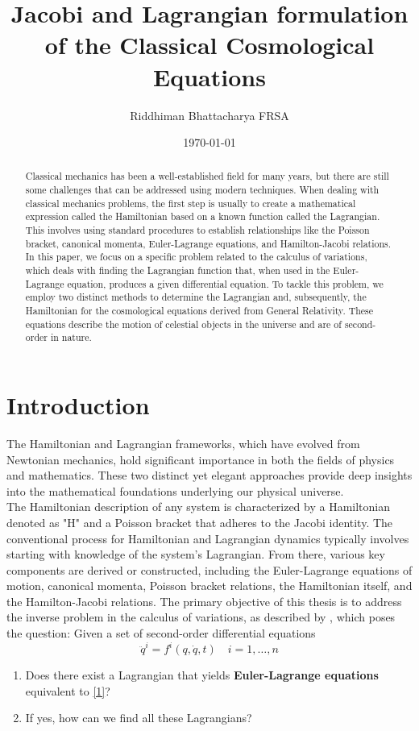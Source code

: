 \documentclass[12pt]{article}
\title{\textbf{\Huge Jacobi and Lagrangian formulation of the Classical Cosmological Equations}}
\author{Riddhiman Bhattacharya FRSA}
\affil{Fellow of Royal Society of Arts, London, UK\\
Contact:\url{riddhiman.butai2005@gmail.com}}
\date{\today}
\begin{document}
\maketitle
\begin{abstract}

    Classical mechanics has been a well-established field for many years, but there are still some challenges that can be addressed using modern techniques. When dealing with classical mechanics problems, the first step is usually to create a mathematical expression called the Hamiltonian based on a known function called the Lagrangian. This involves using standard procedures to establish relationships like the Poisson bracket, canonical momenta, Euler-Lagrange equations, and Hamilton-Jacobi relations. In this paper, we focus on a specific problem related to the calculus of variations, which deals with finding the Lagrangian function that, when used in the Euler-Lagrange equation, produces a given differential equation. To tackle this problem, we employ two distinct methods to determine the Lagrangian and, subsequently, the Hamiltonian for the cosmological equations derived from General Relativity. These equations describe the motion of celestial objects in the universe and are of second-order in nature.
\end{abstract}
\section{Introduction}
The Hamiltonian and Lagrangian frameworks, which have evolved from Newtonian mechanics, hold significant importance in both the fields of physics and mathematics. These two distinct yet elegant approaches provide deep insights into the mathematical foundations underlying our physical universe.\\
The Hamiltonian description of any system is characterized by a Hamiltonian denoted as "H" and a Poisson bracket that adheres to the Jacobi identity. The conventional process for Hamiltonian and Lagrangian dynamics typically involves starting with knowledge of the system's Lagrangian. From there, various key components are derived or constructed, including the Euler-Lagrange equations of motion, canonical momenta, Poisson bracket relations, the Hamiltonian itself, and the Hamilton-Jacobi relations.
The primary objective of this thesis is to address the inverse problem in the calculus of variations, as described by \cite{hojman2014construction}, which poses the question: Given a set of second-order differential equations
\begin{equation}
\ddot{q}^{i}=f^{i}(q, \dot{q}, t) \quad i=1, \ldots, n
\label{1}
\end{equation}
\begin{enumerate}
    \item Does there exist a Lagrangian that yields \textbf{Euler-Lagrange equations} equivalent to \eqref{1}?
    \item If yes, how can we find all these Lagrangians?
\end{enumerate}
\end{document}
